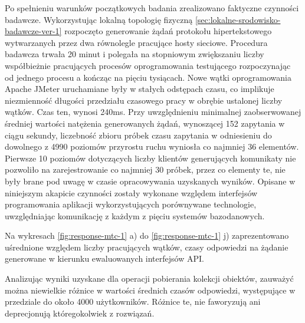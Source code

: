 Po spełnieniu warunków początkowych badania zrealizowano faktyczne czynności badawcze. Wykorzystując lokalną topologię fizyczną \ref{sec:lokalne-srodowisko-badawcze-ver-1} rozpoczęto generowanie żądań protokołu hipertekstowego wytwarzanych przez dwa równolegle pracujące hosty sieciowe. Procedura badawcza trwała 20 minut i polegała na stopniowym zwiększaniu liczby współbieżnie pracujących procesów oprogramowania testującego rozpoczynając od jednego procesu a kończąc na pięciu tysiącach. Nowe wątki oprogramowania Apache JMeter uruchamiane były w stałych odstępach czasu, co implikuje niezmienność długości przedziału czasowego pracy w obrębie ustalonej liczby wątków. Czas ten, wynosi 240ms. Przy uwzględnieniu minimalnej zaobserwowanej średniej wartości natężenia generowanych żądań, wynoszącej 152 zapytania w ciągu sekundy, liczebność zbioru próbek czasu zapytania w odniesieniu do dowolnego z 4990 poziomów przyrostu ruchu wyniosła co najmniej 36 elementów. Pierwsze 10 poziomów dotyczących liczby klientów generujących komunikaty nie pozwoliło na zarejestrowanie co najmniej 30 próbek, przez co elementy te, nie były brane pod uwagę w czasie opracowywania uzyskanych wyników. Opisane w niniejszym akapicie czynności zostały wykonane względem interfejsów programowania aplikacji wykorzystujących porównywane technologie, uwzględniając komunikację z każdym z pięciu systemów bazodanowych.

Na wykresach \ref{fig:response-mtc-1} a) do \ref{fig:response-mtc-1} j) zaprezentowano uśrednione względem liczby pracujących wątków, czasy odpowiedzi na żądanie generowane w kierunku ewaluowanych interfejsów API.

Analizując wyniki uzyskane dla operacji pobierania kolekcji obiektów, zauważyć można niewielkie różnice w wartości średnich czasów odpowiedzi, występujące w przedziale do około 4000 użytkowników. Różnice te, nie faworyzują ani deprecjonują któregokolwiek z rozwiązań.

